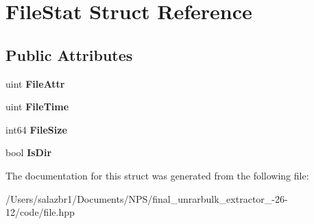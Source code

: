 \hypertarget{struct_file_stat}{\section{File\-Stat Struct Reference}
\label{struct_file_stat}
}
\subsection*{Public Attributes}
\begin{DoxyCompactItemize}
\item 
\hypertarget{struct_file_stat_a4208c20f7cb8f4de40f969d868e23aa7}{uint {\bfseries File\-Attr}}\label{struct_file_stat_a4208c20f7cb8f4de40f969d868e23aa7}

\item 
\hypertarget{struct_file_stat_a44c9b84266cbafb72638cc917d402118}{uint {\bfseries File\-Time}}\label{struct_file_stat_a44c9b84266cbafb72638cc917d402118}

\item 
\hypertarget{struct_file_stat_a7dc9075fd5653be11684da2100df8730}{int64 {\bfseries File\-Size}}\label{struct_file_stat_a7dc9075fd5653be11684da2100df8730}

\item 
\hypertarget{struct_file_stat_ae7133c1062c235c174a801d896ec1cd1}{bool {\bfseries Is\-Dir}}\label{struct_file_stat_ae7133c1062c235c174a801d896ec1cd1}

\end{DoxyCompactItemize}


The documentation for this struct was generated from the following file\-:\begin{DoxyCompactItemize}
\item 
/\-Users/salazbr1/\-Documents/\-N\-P\-S/final\-\_\-unrarbulk\-\_\-extractor\-\_-\/26-\/12/code/file.\-hpp\end{DoxyCompactItemize}
